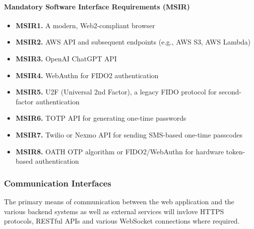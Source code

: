 \paragraph{Mandatory Software Interface Requirements (MSIR)}
\begin{itemize}
    \item \textbf{MSIR1.} A modern, Web2-compliant browser
    \item \textbf{MSIR2.} AWS API and subsequent endpoints (e.g., AWS S3, AWS Lambda)
    \item \textbf{MSIR3.} OpenAI ChatGPT API
    \item \textbf{MSIR4.} WebAuthn for FIDO2 authentication
    \item \textbf{MSIR5.} U2F (Universal 2nd Factor), a legacy FIDO protocol for second-factor authentication
    \item \textbf{MSIR6.} TOTP API for generating one-time passwords
    \item \textbf{MSIR7.} Twilio or Nexmo API for sending SMS-based one-time passcodes
    \item \textbf{MSIR8.} OATH OTP algorithm or FIDO2/WebAuthn for hardware token-based authentication

\end{itemize}




\subsubsection{Communication Interfaces}
The primary means of communication between the web application and the various backend systems as well as external services will invlove HTTPS protocols, RESTful APIs and various WebSocket connections where required. 

